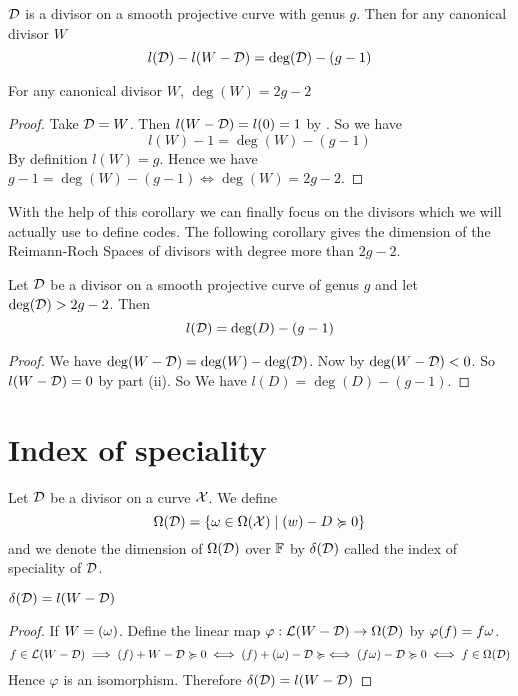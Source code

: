 \begin{theorem}
	$\mathcal{D}$ is a divisor on a smooth projective curve with genus $g$. Then for any canonical divisor $W$ $$l(\mathcal{D}) - l(W-\mathcal{D})= \deg(\mathcal{D})- (g-1)$$
\end{theorem}
\begin{corollary}\label{candivdeg}
	For any canonical divisor $W$,  $\deg(W)=2g-2$
\end{corollary}
\begin{proof}
	Take $\mathcal{D}=W$. Then $l(W-\mathcal{D})=l(0)=1$ by . So we have $$l(W)-1=\deg(W)-(g-1)$$ By definition $l(W)=g$. Hence we have $g-1=\deg(W)-(g-1)\iff \deg(W)=2g-2$.
\end{proof}
With the help of this corollary we can finally focus on the divisors which we will actually use to define codes. The following corollary gives the dimension of the Reimann-Roch Spaces of divisors with degree more than $2g-2$.
\begin{corollary}\label{divdimdeg}
	Let $\mathcal{D}$ be a divisor on a smooth projective curve of genus $g$ and let $\deg(\mathcal{D})>2g-2$. Then $$l(\mathcal{D})=\deg(D)-(g-1)$$
\end{corollary}
\begin{proof}
	We have $\deg(W-\mathcal{D})=\deg(W)-\deg(\mathcal{D})$. Now by  $\deg(W-\mathcal{D})<0$. So  $l(W-\mathcal{D})=0$ by  part (ii). So We have $l(D)=\deg(D)-(g-1)$.
\end{proof}
\section{Index of speciality}
\begin{definition}
	Let $\mathcal{D}$ be a divisor on a curve $\mathcal{X}$. We define $$\Omega(\mathcal{D})=\{\omega\in \Omega(\mathcal{X})\mid (w)-D\succcurlyeq 0\}$$ and we denote the dimension of $\Omega(\mathcal{D})$ over $\mathbb{F}$ by $\delta(\mathcal{D})$ called the index of speciality of $\mathcal{D}$.
\end{definition}
\begin{theorem}
	$\delta(\mathcal{D})=l(W-\mathcal{D})$
\end{theorem}
\begin{proof}
	If $W=(\omega)$. Define the linear map $\varphi:\mathcal{L}(W-\mathcal{D})\to \Omega(\mathcal{D})$ by $\varphi(f)=f\omega$. $$f\in \mathcal{L}(W-\mathcal{D})\implies (f)+W-\mathcal{D}\succcurlyeq 0 \iff (f)+(\omega)-\mathcal{D}\succcurlyeq \iff (f\omega)-\mathcal{D}\succcurlyeq0\iff f\in \Omega(\mathcal{D})$$Hence $\varphi$ is an isomorphism. Therefore $\delta(\mathcal{D})=l(W-\mathcal{D})$
\end{proof}